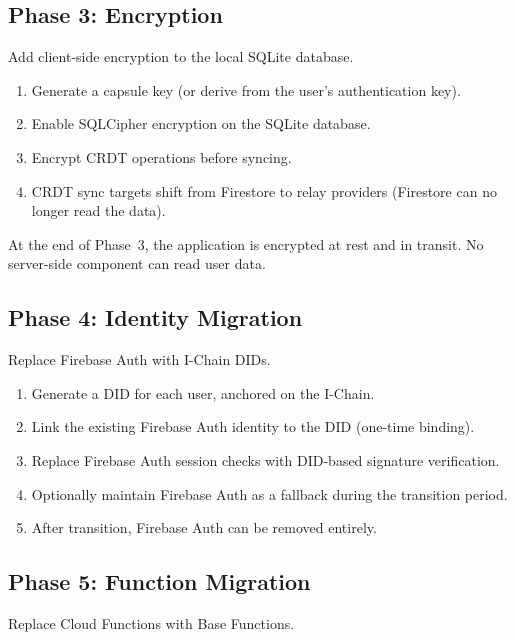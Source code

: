 \documentclass[11pt,a4paper]{article}
\begin{document}
\subsection{Phase 3: Encryption}

Add client-side encryption to the local SQLite database.

\begin{enumerate}
    \item Generate a capsule key (or derive from the user's authentication key).
    \item Enable SQLCipher encryption on the SQLite database.
    \item Encrypt CRDT operations before syncing.
    \item CRDT sync targets shift from Firestore to relay providers (Firestore
    can no longer read the data).
\end{enumerate}

At the end of Phase~3, the application is encrypted at rest and in transit.
No server-side component can read user data.

\subsection{Phase 4: Identity Migration}

Replace Firebase Auth with I-Chain DIDs.

\begin{enumerate}
    \item Generate a DID for each user, anchored on the I-Chain.
    \item Link the existing Firebase Auth identity to the DID (one-time binding).
    \item Replace Firebase Auth session checks with DID-based signature verification.
    \item Optionally maintain Firebase Auth as a fallback during the transition period.
    \item After transition, Firebase Auth can be removed entirely.
\end{enumerate}

\subsection{Phase 5: Function Migration}

Replace Cloud Functions with Base Functions.
\end{document}
